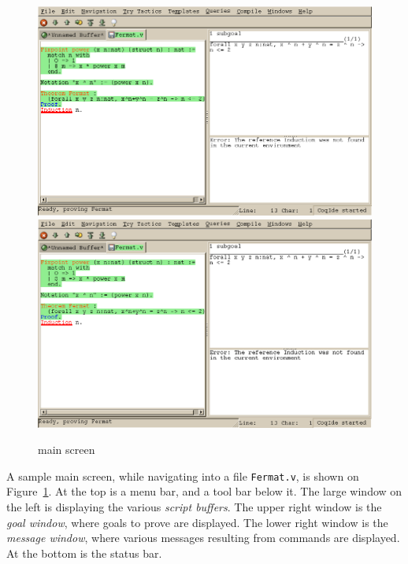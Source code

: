 \begin{figure}[t]
\begin{center}
\ifpdf   %
\includegraphics[width=1.0\textwidth]{coqide.png}
\else
\includegraphics[width=1.0\textwidth]{coqide.eps}
\fi
\end{center}
\caption{\CoqIDE{} main screen}
\label{fig:coqide}
\end{figure}

A sample \CoqIDE{} main screen, while navigating into a file
\verb|Fermat.v|, is shown on Figure~\ref{fig:coqide}.  At
the top is a menu bar, and a tool bar below it. The large window on
the left is displaying the various \emph{script buffers}. The upper right
window is the \emph{goal window}, where goals to 
prove are displayed. The lower right window is the \emph{message window},
where various messages resulting from commands are displayed. At the
bottom is the status bar.

